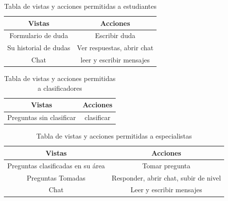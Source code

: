 	\begin{table}[h]
		\begin{center}
		\begin{tabular}{| c | c |}
			\hline
			Vistas & Acciones \\ \hline
			Formulario de duda & Escribir duda  \\ \hline 
			Su historial de dudas & Ver respuestas, abrir chat  \\ \hline
			Chat & leer y escribir mensajes \\ \hline
			
		\end{tabular}
		\caption{Tabla de vistas y acciones permitidas a estudiantes}
		\label{table:student_views}
		
	\end{center}
	\end{table}


	\begin{table}[h]
	\begin{center}
		\begin{tabular}{| c | c |}
			\hline
			Vistas & Acciones \\ \hline
			Preguntas sin clasificar & clasificar  \\ \hline 
		\end{tabular}
		\caption{Tabla de vistas y acciones permitidas a clasificadores}
		\label{table:clasifier_views}
		
	\end{center}
\end{table}


	\begin{table}[h]
	\begin{center}
		\begin{tabular}{| c | c |}
			\hline
			Vistas & Acciones \\ \hline
			Preguntas clasificadas en su área & Tomar pregunta  \\ \hline 
			Preguntas Tomadas & Responder, abrir chat, subir de nivel  \\ \hline 
			Chat & Leer y escribir mensajes  \\ \hline 
		\end{tabular}
		\caption{Tabla de vistas y acciones permitidas a especialistas}
		\label{table:specialist_views}
		
	\end{center}
\end{table}


